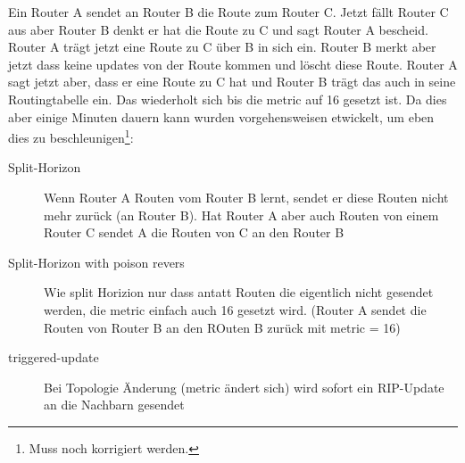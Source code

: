 \documentclass[a4paper,10pt]{scrartcl}
\begin{document}
                    Ein Router A sendet an Router B die Route zum Router C. Jetzt fällt Router C aus aber Router B denkt er hat die Route zu C und sagt Router A bescheid. 
                    Router A trägt jetzt eine Route zu C über B in sich ein. Router B merkt aber jetzt dass keine updates von der Route kommen und löscht diese Route. Router A
                    sagt jetzt aber, dass er eine Route zu C hat und Router B trägt das auch in seine Routingtabelle ein. Das wiederholt sich bis die metric auf 16 gesetzt ist. Da dies
                    aber einige Minuten dauern kann wurden vorgehensweisen etwickelt, um eben dies zu beschleunigen\footnote{Muss noch korrigiert werden.}:
                    \begin{description}
                        \item[Split-Horizon] 
                            Wenn Router A Routen vom Router B lernt, sendet er diese Routen nicht mehr zurück (an Router B).
                            Hat Router A aber auch Routen von einem Router C sendet A die Routen von C an den Router B 
                        \item[Split-Horizon with poison revers] Wie split Horizion nur dass antatt Routen die eigentlich nicht gesendet werden, die metric einfach auch 16 gesetzt wird. 
                            (Router A sendet die Routen von Router B an den ROuten B zurück mit metric = 16)
                        \item[triggered-update] 
                            Bei Topologie Änderung (metric ändert sich) wird sofort ein RIP-Update an die Nachbarn gesendet
                    \end{description}
            
\end{document}
